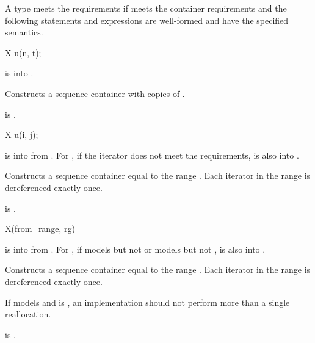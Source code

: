 \pnum
A type  meets the  requirements
if  meets the container requirements and
the following statements and expressions are well-formed and have
the specified semantics.

\begin{itemdecl}
X u(n, t);
\end{itemdecl}

\begin{itemdescr}
\pnum
\expects
{} is  into .

\pnum
\effects
Constructs a sequence container with  copies of .

\pnum
\ensures
{} is .
\end{itemdescr}

\begin{itemdecl}
X u(i, j);
\end{itemdecl}

\begin{itemdescr}
\pnum
\expects
{} is  into  from .
For ,
if the iterator does not meet
the  requirements,
 is also  into .

\pnum
\effects
Constructs a sequence container equal to the range .
Each iterator in the range  is dereferenced exactly once.

\pnum
\ensures
{} is .
\end{itemdescr}

\begin{itemdecl}
X(from_range, rg)
\end{itemdecl}

\begin{itemdescr}
\pnum
\expects
{} is  into 
from .
For ,
if  models
but not  or models
but not ,
 is also  into .

\pnum
\effects
Constructs a sequence container equal to the range .
Each iterator in the range  is dereferenced exactly once.

\pnum
\recommended
If  models  and
 is ,
an implementation should not perform more than a single reallocation.

\pnum
\ensures
{} is .
\end{itemdescr}

